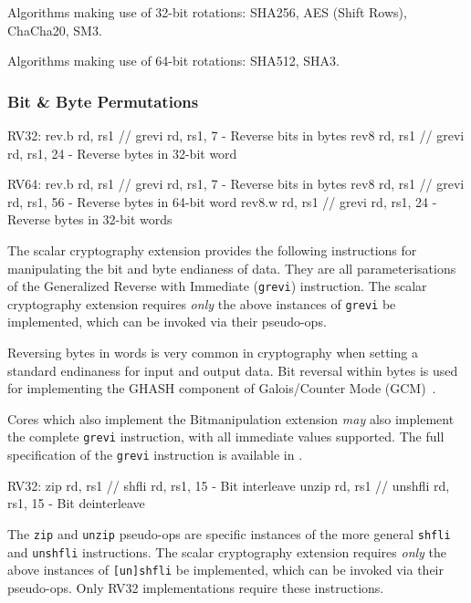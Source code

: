 Algorithms making use of 32-bit rotations:
SHA256, AES (Shift Rows), ChaCha20, SM3.

Algorithms making use of 64-bit rotations:
SHA512, SHA3.

\subsubsection{Bit \& Byte Permutations}
\label{sec:scalar:bitmanip:grev}

\begin{cryptobitmanipisa}
RV32:
    rev.b   rd, rs1 // grevi rd, rs1,  7 - Reverse bits in bytes
    rev8    rd, rs1 // grevi rd, rs1, 24 - Reverse bytes in 32-bit word

RV64:
    rev.b   rd, rs1 // grevi rd, rs1,  7 - Reverse bits in bytes
    rev8    rd, rs1 // grevi rd, rs1, 56 - Reverse bytes in 64-bit word
    rev8.w  rd, rs1 // grevi rd, rs1, 24 - Reverse bytes in 32-bit words
\end{cryptobitmanipisa}

The scalar cryptography extension provides the following instructions for
manipulating the bit and byte endianess of data.
They are all parameterisations of the Generalized Reverse with Immediate
({\tt grevi}) instruction.
The scalar cryptography extension requires {\em only} the above instances
of {\tt grevi} be implemented, which can be invoked via their pseudo-ops.

Reversing bytes in words is very common in cryptography when setting a
standard endinaness for input and output data.
Bit reversal within bytes is used for implementing the GHASH  component
of Galois/Counter Mode (GCM)~\cite{nist:gcm}.

Cores which also implement the Bitmanipulation extension {\em may} also
implement the complete {\tt grevi} instruction, with all immediate values
supported.
The full specification of the {\tt grevi} instruction is available in
\cite[Section 2.2.2]{riscv:bitmanip:draft}.

\begin{cryptobitmanipisa}
RV32:
    zip     rd, rs1 // shfli   rd, rs1, 15 - Bit interleave
    unzip   rd, rs1 // unshfli rd, rs1, 15 - Bit deinterleave
\end{cryptobitmanipisa}

The {\tt zip} and {\tt unzip} pseudo-ops are specific instances of
the more general {\tt shfli} and {\tt unshfli} instructions.
The scalar cryptography extension requires {\em only} the above instances
of {\tt [un]shfli} be implemented, which can be invoked via their
pseudo-ops.
Only RV32 implementations require these instructions.

